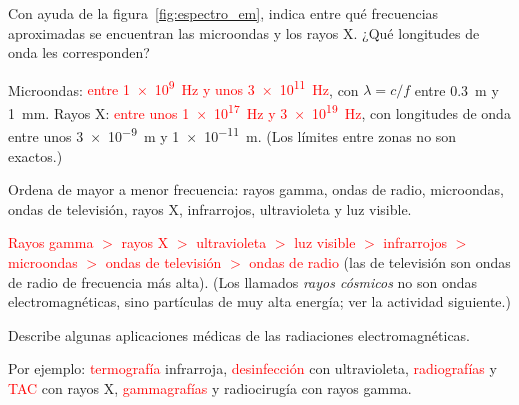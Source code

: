 \begin{exercise}
    Con ayuda de la figura~\ref{fig:espectro_em}, indica entre qué frecuencias aproximadas se encuentran las microondas y los rayos X. ¿Qué longitudes de onda les corresponden?
    \begin{solu}
        Microondas: \textcolor{red}{entre \qty{1e9}{\hertz} y unos \qty{3e11}{\hertz}}, con \(\lambda = c/f\) entre \qty{0.3}{\m} y \qty{1}{\milli\m}. Rayos X: \textcolor{red}{entre unos \qty{1e17}{\hertz} y \qty{3e19}{\hertz}}, con longitudes de onda entre unos \qty{3e-9}{\m} y \qty{1e-11}{\m}. (Los límites entre zonas no son exactos.)
    \end{solu}
\end{exercise}

\begin{exercise}
    Ordena de mayor a menor frecuencia: rayos gamma, ondas de radio, microondas, ondas de televisión, rayos X, infrarrojos, ultravioleta y luz visible.
    \begin{solu}
        \textcolor{red}{Rayos gamma \(>\) rayos X \(>\) ultravioleta \(>\) luz visible \(>\) infrarrojos \(>\) microondas \(>\) ondas de televisión \(>\) ondas de radio} (las de televisión son ondas de radio de frecuencia más alta). (Los llamados \emph{rayos cósmicos} no son ondas electromagnéticas, sino partículas de muy alta energía; ver la actividad siguiente.)
    \end{solu}
\end{exercise}

\begin{exercise}
    Describe algunas aplicaciones médicas de las radiaciones electromagnéticas.
    \begin{solu}
        Por ejemplo: \textcolor{red}{termografía} infrarroja, \textcolor{red}{desinfección} con ultravioleta, \textcolor{red}{radiografías} y \textcolor{red}{TAC} con rayos X, \textcolor{red}{gammagrafías} y radiocirugía con rayos gamma.
    \end{solu}
\end{exercise}


